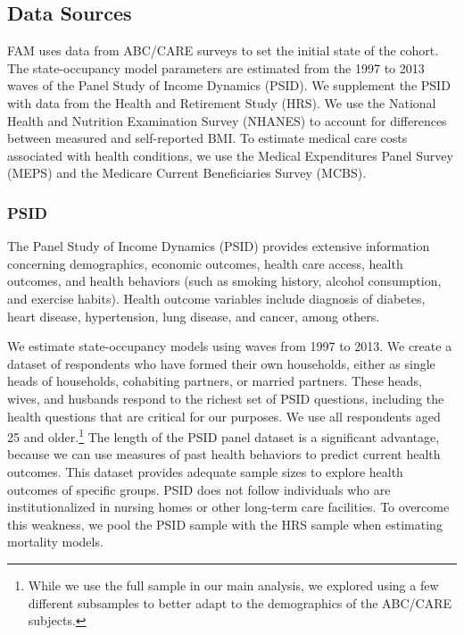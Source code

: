 \subsection{Data Sources} \label{section:data}

\noindent FAM uses data from ABC/CARE surveys to set the initial state of the cohort.
The state-occupancy model parameters are estimated from the 1997 to 2013 waves of the Panel Study of Income Dynamics (PSID).
We supplement the PSID with data from the Health and Retirement Study (HRS). We use the National Health and Nutrition Examination Survey (NHANES)
to account for differences between measured and self-reported BMI.
To estimate medical care costs associated with health conditions, we use the Medical Expenditures Panel Survey (MEPS) and the Medicare Current Beneficiaries Survey (MCBS).


\subsubsection{PSID}
\label{section:data_psid}

\noindent The Panel Study of Income Dynamics (PSID) provides extensive information concerning demographics, economic outcomes, health care access, health outcomes, and health behaviors (such as smoking history, alcohol consumption, and exercise habits). Health outcome variables include diagnosis of diabetes, heart disease, hypertension, lung disease, and cancer, among others.

\noindent We estimate state-occupancy models using waves from 1997 to 2013. We create a dataset of respondents who have formed their own households, either
as single heads of households, cohabiting partners, or married partners. These heads, wives, and husbands respond to the richest
set of PSID questions, including the health questions that are critical for our purposes. We use all respondents aged 25 and older.\footnote{While we use the full sample in our main analysis, we explored using a few different subsamples to better adapt to the demographics of the ABC/CARE subjects.}
The length of the PSID panel dataset is a significant advantage, because we can use measures of past health behaviors to predict current health outcomes. This dataset provides adequate sample sizes to explore health outcomes of specific groups.
PSID does not follow individuals who are institutionalized in nursing homes or other long-term care facilities. To overcome this weakness, we pool the PSID sample with the HRS sample when
estimating mortality models.

